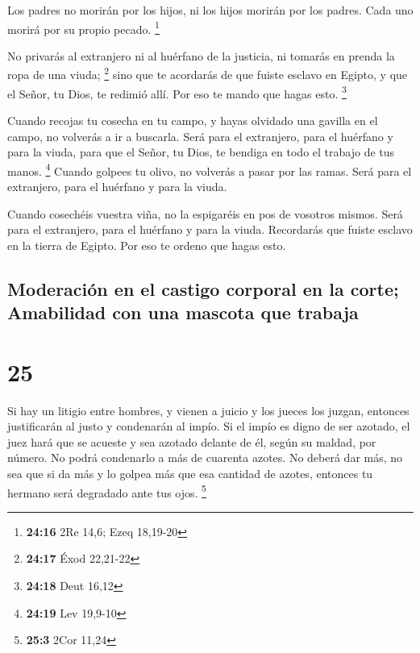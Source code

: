  Los padres no morirán por los hijos, ni los hijos
morirán por los padres. Cada uno morirá por su propio pecado.
\footnote{\textbf{24:16} 2Re 14,6; Ezeq 18,19-20}

 No privarás al extranjero ni al huérfano de la justicia,
ni tomarás en prenda la ropa de una viuda; \footnote{\textbf{24:17} Éxod
  22,21-22}  sino que te acordarás de que fuiste esclavo
en Egipto, y que el Señor, tu Dios, te redimió allí. Por eso te mando
que hagas esto. \footnote{\textbf{24:18} Deut 16,12}

 Cuando recojas tu cosecha en tu campo, y hayas olvidado
una gavilla en el campo, no volverás a ir a buscarla. Será para el
extranjero, para el huérfano y para la viuda, para que el Señor, tu
Dios, te bendiga en todo el trabajo de tus manos. \footnote{\textbf{24:19}
  Lev 19,9-10}  Cuando golpees tu olivo, no volverás a
pasar por las ramas. Será para el extranjero, para el huérfano y para la
viuda.

 Cuando cosechéis vuestra viña, no la espigaréis en pos
de vosotros mismos. Será para el extranjero, para el huérfano y para la
viuda.  Recordarás que fuiste esclavo en la tierra de
Egipto. Por eso te ordeno que hagas esto.

\hypertarget{moderaciuxf3n-en-el-castigo-corporal-en-la-corte-amabilidad-con-una-mascota-que-trabaja}{%
\subsection{Moderación en el castigo corporal en la corte; Amabilidad
con una mascota que
trabaja}\label{moderaciuxf3n-en-el-castigo-corporal-en-la-corte-amabilidad-con-una-mascota-que-trabaja}}

\hypertarget{section-24}{%
\section{25}\label{section-24}}

 Si hay un litigio entre hombres, y vienen a juicio y los
jueces los juzgan, entonces justificarán al justo y condenarán al impío.
 Si el impío es digno de ser azotado, el juez hará que se
acueste y sea azotado delante de él, según su maldad, por número.
 No podrá condenarlo a más de cuarenta azotes. No deberá
dar más, no sea que si da más y lo golpea más que esa cantidad de
azotes, entonces tu hermano será degradado ante tus ojos. \footnote{\textbf{25:3}
  2Cor 11,24}

